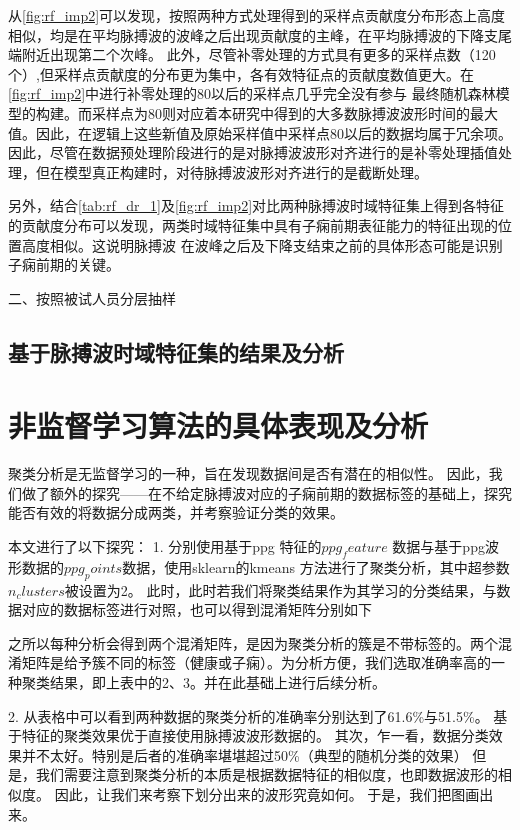 从\autoref{fig:rf_imp2}可以发现，按照两种方式处理得到的采样点贡献度分布形态上高度相似，均是在平均脉搏波的波峰之后出现贡献度的主峰，在平均脉搏波的下降支尾端附近出现第二个次峰。
此外，尽管补零处理的方式具有更多的采样点数（120个）,但采样点贡献度的分布更为集中，各有效特征点的贡献度数值更大。在\autoref{fig:rf_imp2}中进行补零处理的80以后的采样点几乎完全没有参与
最终随机森林模型的构建。而采样点为80则对应着本研究中得到的大多数脉搏波波形时间的最大值。因此，在逻辑上这些新值及原始采样值中采样点80以后的数据均属于冗余项。
因此，尽管在数据预处理阶段进行的是对脉搏波波形对齐进行的是补零处理插值处理，但在模型真正构建时，对待脉搏波波形对齐进行的是截断处理。

另外，结合\autoref{tab:rf_dr_1}及\autoref{fig:rf_imp2}对比两种脉搏波时域特征集上得到各特征的贡献度分布可以发现，两类时域特征集中具有子痫前期表征能力的特征出现的位置高度相似。这说明脉搏波
在波峰之后及下降支结束之前的具体形态可能是识别子痫前期的关键。

二、按照被试人员分层抽样








\subsection{基于脉搏波时域特征集的结果及分析}

\section{非监督学习算法的具体表现及分析}
聚类分析是无监督学习的一种，旨在发现数据间是否有潜在的相似性\cite{Liu2018,Li2017}。
因此，我们做了额外的探究——在不给定脉搏波对应的子痫前期的数据标签的基础上，探究能否有效的将数据分成两类，并考察验证分类的效果。

本文进行了以下探究：
1.	分别使用基于ppg 特征的$ppg_feature$ 数据与基于ppg波形数据的$ppg_points $数据，使用sklearn的kmeans 方法进行了聚类分析，其中超参数$n_clusters$被设置为2。
此时，此时若我们将聚类结果作为其学习的分类结果，与数据对应的数据标签进行对照，也可以得到混淆矩阵分别如下

之所以每种分析会得到两个混淆矩阵，是因为聚类分析的簇是不带标签的。两个混淆矩阵是给予簇不同的标签（健康或子痫）。为分析方便，我们选取准确率高的一种聚类结果，即上表中的2、3。并在此基础上进行后续分析。

2.	从表格中可以看到两种数据的聚类分析的准确率分别达到了61.6\%与51.5\%。
基于特征的聚类效果优于直接使用脉搏波波形数据的。
其次，乍一看，数据分类效果并不太好。特别是后者的准确率堪堪超过50\%（典型的随机分类的效果）
但是，我们需要注意到聚类分析的本质是根据数据特征的相似度，也即数据波形的相似度。
因此，让我们来考察下划分出来的波形究竟如何。
于是，我们把图画出来。

